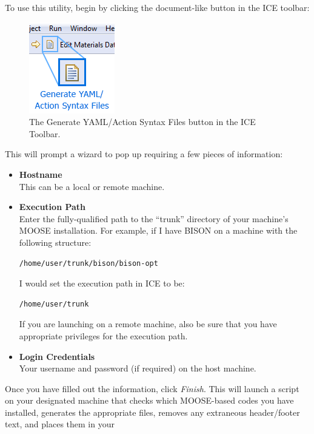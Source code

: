 To use this utility, begin by clicking the document-like button in the
ICE toolbar:

\begin{figure}[htbp]
\centering
\includegraphics{figures/ICE_YAMLGeneratorButton.png}
\caption{The Generate YAML/Action Syntax Files button in the ICE Toolbar.}
\end{figure}

This will prompt a wizard to pop up requiring a few pieces of
information:

\begin{itemize}
\itemsep1pt\parskip0pt
\item
  \textbf{Hostname}\\This can be a local or remote machine.
\item
  \textbf{Execution Path}\\Enter the fully-qualified path to the
  ``trunk'' directory of your machine's MOOSE installation. For example,
  if I have BISON on a machine with the following structure:

\begin{verbatim}
/home/user/trunk/bison/bison-opt
\end{verbatim}

  I would set the execution path in ICE to be:

\begin{verbatim}
/home/user/trunk
\end{verbatim}

  If you are launching on a remote machine, also be sure that you have
  appropriate privileges for the execution path.\\
\item
  \textbf{Login Credentials}\\Your username and password (if required)
  on the host machine.
\end{itemize}

Once you have filled out the information, click \emph{Finish}. This will
launch a script on your designated machine that checks which MOOSE-based
codes you have installed, generates the appropriate files, removes any
extraneous header/footer text, and places them in your

